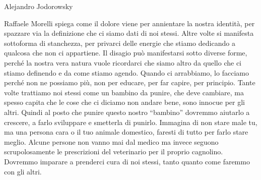 \documentclass[12pt]{book} %
\begin{document}
Alejandro Jodorowsky

Raffaele Morelli spiega come il dolore viene per annientare la nostra identità, per spazzare via la definizione che ci
siamo dati di noi stessi. Altre volte si manifesta sottoforma di stanchezza, per privarci delle energie che stiamo
dedicando a qualcosa che non ci appartiene. Il disagio può manifestarsi sotto diverse forme, perché la nostra vera
natura vuole ricordarci che siamo altro da quello che ci stiamo definendo e da come stiamo agendo. Quando ci
arrabbiamo, lo facciamo perché non ne possiamo più, non per educare, per far capire, per principio. Tante volte
trattiamo noi stessi come un bambino da punire, che deve cambiare, ma spesso capita che le cose che ci diciamo non
andare bene, sono innocue per gli altri. Quindi al posto che punire questo nostro “bambino” dovremmo aiutarlo a
crescere, a farlo sviluppare e smetterla di punirlo. 
Immagina di non stare male tu, ma una
persona cara o il tuo animale domestico, faresti di tutto per farlo stare meglio. Alcune persone non vanno mai dal
medico ma invece seguono scrupolosamente le prescrizioni del veterinario per il proprio cagnolino. Dovremmo imparare a
prenderci cura di noi stessi, tanto quanto come faremmo con gli altri.
\end{document}
